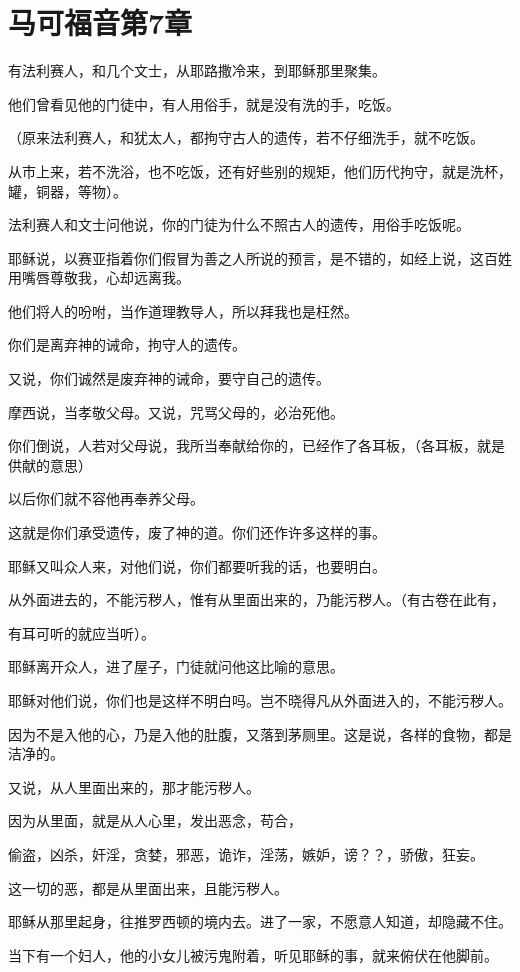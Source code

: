 \documentclass[12pt,oneside]{book}
\begin{document}
\chapter{马可福音第7章}
有法利赛人，和几个文士，从耶路撒冷来，到耶稣那里聚集。

他们曾看见他的门徒中，有人用俗手，就是没有洗的手，吃饭。

（原来法利赛人，和犹太人，都拘守古人的遗传，若不仔细洗手，就不吃饭。

从市上来，若不洗浴，也不吃饭，还有好些别的规矩，他们历代拘守，就是洗杯，罐，铜器，等物）。

法利赛人和文士问他说，你的门徒为什么不照古人的遗传，用俗手吃饭呢。

耶稣说，以赛亚指着你们假冒为善之人所说的预言，是不错的，如经上说，这百姓用嘴唇尊敬我，心却远离我。

他们将人的吩咐，当作道理教导人，所以拜我也是枉然。

你们是离弃神的诫命，拘守人的遗传。

又说，你们诚然是废弃神的诫命，要守自己的遗传。

摩西说，当孝敬父母。又说，咒骂父母的，必治死他。

你们倒说，人若对父母说，我所当奉献给你的，已经作了各耳板，（各耳板，就是供献的意思）

以后你们就不容他再奉养父母。

这就是你们承受遗传，废了神的道。你们还作许多这样的事。

耶稣又叫众人来，对他们说，你们都要听我的话，也要明白。

从外面进去的，不能污秽人，惟有从里面出来的，乃能污秽人。（有古卷在此有，

有耳可听的就应当听）。

耶稣离开众人，进了屋子，门徒就问他这比喻的意思。

耶稣对他们说，你们也是这样不明白吗。岂不晓得凡从外面进入的，不能污秽人。

因为不是入他的心，乃是入他的肚腹，又落到茅厕里。这是说，各样的食物，都是洁净的。

又说，从人里面出来的，那才能污秽人。

因为从里面，就是从人心里，发出恶念，苟合，

偷盗，凶杀，奸淫，贪婪，邪恶，诡诈，淫荡，嫉妒，谤？？，骄傲，狂妄。

这一切的恶，都是从里面出来，且能污秽人。

耶稣从那里起身，往推罗西顿的境内去。进了一家，不愿意人知道，却隐藏不住。

当下有一个妇人，他的小女儿被污鬼附着，听见耶稣的事，就来俯伏在他脚前。
\end{document}
